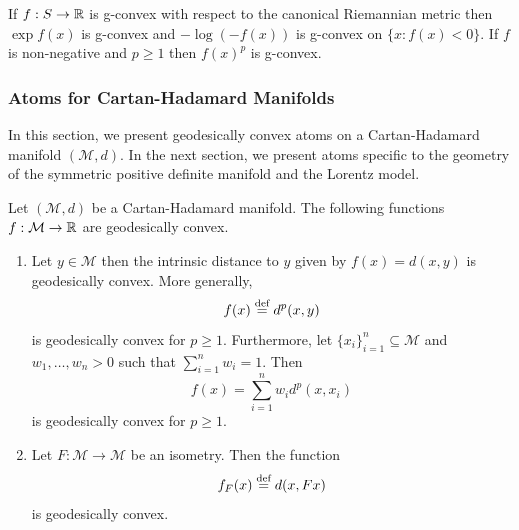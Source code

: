 \documentclass[twoside,11pt]{article}
\begin{document}
\begin{example}
    If $f:S \to \mathbb{R}$ is g-convex with respect to the canonical Riemannian metric then $\exp f(x)$ is g-convex and $- \log (-f(x))$ is g-convex on $\{x : f(x) < 0 \}$. If $f$ is non-negative and $p \geq 1$ then $f(x)^p$ is g-convex.
\end{example}

\subsubsection{Atoms for Cartan-Hadamard Manifolds}
In this section, we present geodesically convex atoms on a Cartan-Hadamard manifold $(\mathcal{M}, d).$ In the next section, we present atoms specific to the geometry of the symmetric positive definite manifold and the Lorentz model. 

\begin{example}
    Let $(\mathcal{M}, d)$ be a Cartan-Hadamard manifold. The following functions $f: \mathcal{M} \to \mathbb{R}$ are geodesically convex.
    \begin{enumerate}
        \item Let $y \in \mathcal{M}$ then the intrinsic distance to $y$ given by $f(x) = d(x,y)$ is geodesically convex. More generally,  
        \[
        f(x) \stackrel{\text{def}}{=} d^p(x,y) 
        \]
        is geodesically convex for $p \geq 1.$ Furthermore, let $\{x_i\}_{i=1}^n \subseteq \mathcal{M}$ and $w_1, \ldots, w_n >0$ such that $\sum_{i=1}^n w_i  = 1$. Then 
        \begin{equation}
        f(x) = \sum_{i=1}^n w_i d^p(x, x_i)    
        \end{equation}
        is geodesically convex for $p \geq 1$.
        \item Let $F:\mathcal{M} \to \mathcal{M}$ be an isometry. Then the function 
        \[
        f_F(x) \stackrel{\text{def}}{=} d(x, Fx) 
        \]
        is geodesically convex.
        
    \end{enumerate}
\end{example}
\end{document}
